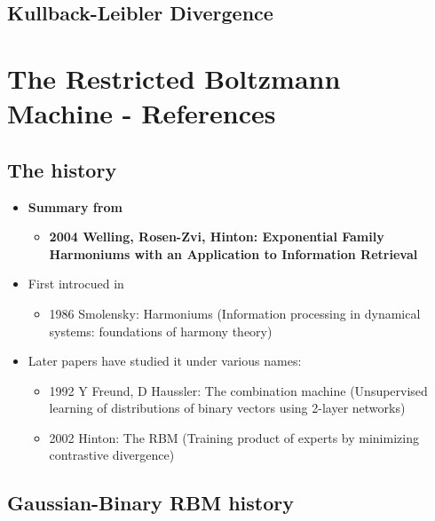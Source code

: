 \documentclass[twoside,english]{uiofysmaster}
\begin{document}
\subsection{Kullback-Leibler Divergence}

\section{The Restricted Boltzmann Machine - References}

\subsection{The history}

\begin{itemize}
	\item \textbf{Summary from}
	\begin{itemize}
		\item \textbf{2004 Welling, Rosen-Zvi, Hinton: Exponential Family Harmoniums with an Application to Information Retrieval} \cite{Welling2005}
\end{itemize}
	\item First introcued in
	\begin{itemize}
		\item 1986 Smolensky: Harmoniums (Information processing in dynamical systems: foundations of harmony theory) \cite{Smolensky1986}
	\end{itemize}
	\item Later papers have studied it under various names:
	\begin{itemize}
		\item 1992 Y Freund, D Haussler: The combination machine (Unsupervised learning of distributions of binary vectors using 2-layer networks) \cite{Freund1992}
		\item 2002 Hinton: The RBM (Training product of experts by minimizing contrastive divergence) \cite{Hinton2002}
	\end{itemize}
\end{itemize}

\subsection{Gaussian-Binary RBM history}
\end{document}
